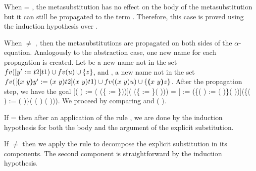 \begin{coqdoccode}
\end{coqdoccode}
When  = , the metasubstitution has no effect on the body of the metasubstitution but it can still be propagated to the term . Therefore, this case is proved using the induction hypothesis over . 
\begin{coqdoccode}
\end{coqdoccode}
When  \ensuremath{\not=} , then the metasubstitutions are propagated on both sides of the $\alpha$-equation. Analogously to the abstraction case, one new name for each propagation is created. Let  be a new name not in the set $fv(\esub{t1}{y'}{t2})\cup fv(u) \cup \{z\}$, and , a new name not in the set $fv(\esub{\swap{x}{y}{t1}}{\vswap{x}{y}{y'}}{\swap{x}{y}{t2}})\cup fv(\swap{x}{y}{u}) \cup \{\vswap{x}{y}{z}\}$. After the propagation step, we have the goal [(   ) := (   (\{ := \}))](   (\{ := \}(   ))) =
  [ := (\{(   ) := (   )\}(   ))](\{(   ) := (   )\}( (   )  (   ))). We proceed by comparing  and (   ).
\begin{coqdoccode}
\end{coqdoccode}
If  =     then after an application of the rule , we are done by the induction hypothesis for both the body and the argument of the explicit substitution.
\begin{coqdoccode}
\end{coqdoccode}
If  \ensuremath{\not=}     then we apply the rule  to decompose the explicit substitution in its components. The second component is straightforward  by the induction hypothesis.
